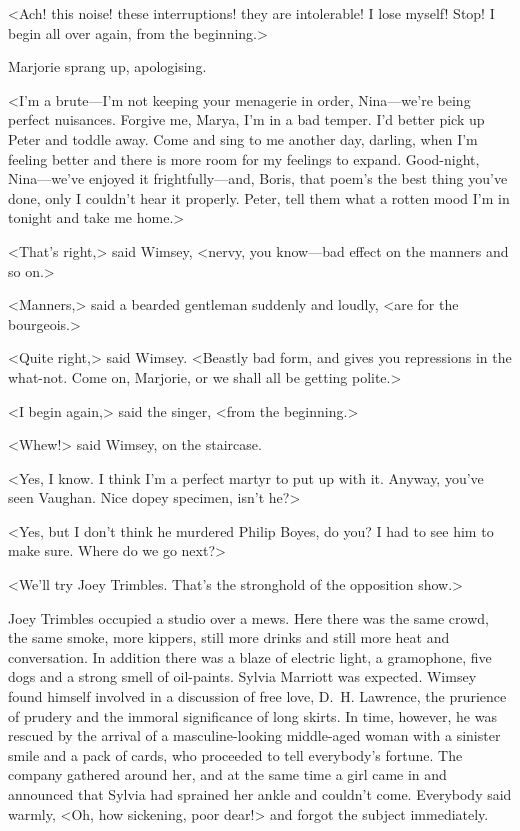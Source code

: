 <Ach! this noise! these interruptions! they are intolerable! I lose myself! Stop! I begin all over again, from the beginning.>

Marjorie sprang up, apologising.

<I'm a brute—I'm not keeping your menagerie in order, Nina—we're being perfect nuisances. Forgive me, Marya, I'm in a bad temper. I'd better pick up Peter and toddle away. Come and sing to me another day, darling, when I'm feeling better and there is more room for my feelings to expand. Good-night, Nina—we've enjoyed it frightfully—and, Boris, that poem's the best thing you've done, only I couldn't hear it properly. Peter, tell them what a rotten mood I'm in tonight and take me home.>

<That's right,> said Wimsey, <nervy, you know—bad effect on the manners and so on.>

<Manners,> said a bearded gentleman suddenly and loudly, <are for the bourgeois.>

<Quite right,> said Wimsey. <Beastly bad form, and gives you repressions in the what-not. Come on, Marjorie, or we shall all be getting polite.>

<I begin again,> said the singer, <from the beginning.>

<Whew!> said Wimsey, on the staircase.

<Yes, I know. I think I'm a perfect martyr to put up with it. Anyway, you've seen Vaughan. Nice dopey specimen, isn't he?>

<Yes, but I don't think he murdered Philip Boyes, do you? I had to see him to make sure. Where do we go next?>

<We'll try Joey Trimbles. That's the stronghold of the opposition show.>

Joey Trimbles occupied a studio over a mews. Here there was the same crowd, the same smoke, more kippers, still more drinks and still more heat and conversation. In addition there was a blaze of electric light, a gramophone, five dogs and a strong smell of oil-paints. Sylvia Marriott was expected. Wimsey found himself involved in a discussion of free love, D.~H. Lawrence, the prurience of prudery and the immoral significance of long skirts. In time, however, he was rescued by the arrival of a masculine-looking middle-aged woman with a sinister smile and a pack of cards, who proceeded to tell everybody's fortune. The company gathered around her, and at the same time a girl came in and announced that Sylvia had sprained her ankle and couldn't come. Everybody said warmly, <Oh, how sickening, poor dear!> and forgot the subject immediately.

